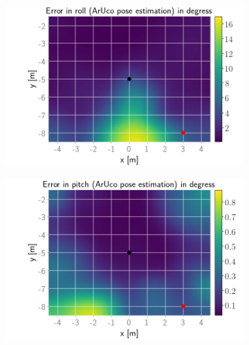 \documentclass[../Head/report.tex]{subfiles}
\begin{document}
\begin{figure}[H]
    \centering
    \begin{subfigure}[t]{.337\textwidth}
        \centering
        \includegraphics[width=\textwidth]{../Figures/GPS2Vision_pose_estimation_test/test1_aruco_board_width_0.2_space_0.1/aruco_pose_estimation_error_roll.png}
        \caption{}
        \label{fig:GPS2Vision_pose_estimation_test1_error_roll}
    \end{subfigure}
    \hspace{-0.9em}
    \begin{subfigure}[t]{.337\textwidth}
        \centering
        \includegraphics[width=\textwidth]{../Figures/GPS2Vision_pose_estimation_test/test1_aruco_board_width_0.2_space_0.1/aruco_pose_estimation_error_pitch.png}
        \caption{}
        \label{fig:GPS2Vision_pose_estimation_test1_error_pitch}
    \end{subfigure}

\end{figure}
\end{document}
